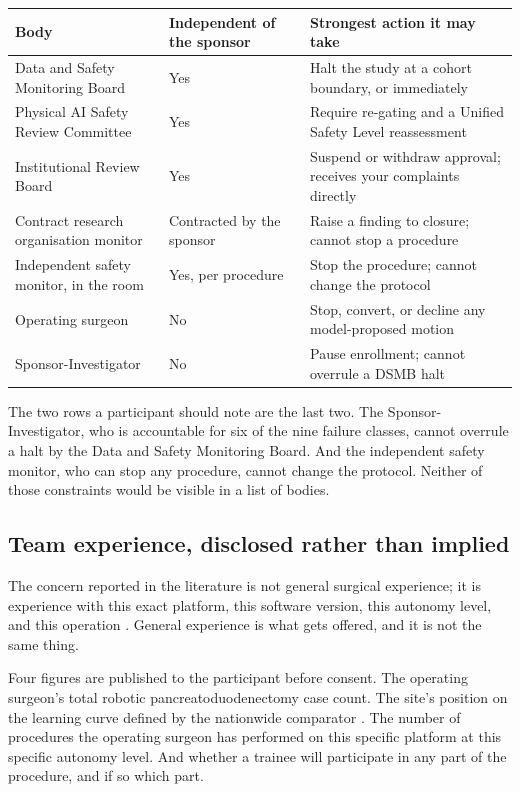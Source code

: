 \noindent\begin{tabularx}{\textwidth}{L{4.1cm} L{4.2cm} Y}
\toprule
\textbf{Body} & \textbf{Independent of the sponsor} & \textbf{Strongest action it may take} \\
\midrule
Data and Safety Monitoring Board & Yes & Halt the study at a cohort boundary, or immediately \\
Physical AI Safety Review Committee & Yes & Require re-gating and a Unified Safety Level reassessment \\
Institutional Review Board & Yes & Suspend or withdraw approval; receives your complaints directly \\
Contract research organisation monitor & Contracted by the sponsor & Raise a finding to closure; cannot stop a procedure \\
Independent safety monitor, in the room & Yes, per procedure & Stop the procedure; cannot change the protocol \\
Operating surgeon & No & Stop, convert, or decline any model-proposed motion \\
Sponsor-Investigator & No & Pause enrollment; cannot overrule a DSMB halt \\
\bottomrule
\end{tabularx}

\vspace{0.30em}

\noindent The two rows a participant should note are the last two. The
Sponsor-Investigator, who is accountable for six of the nine failure classes,
cannot overrule a halt by the Data and Safety Monitoring Board. And the
independent safety monitor, who can stop any procedure, cannot change the
protocol. Neither of those constraints would be visible in a list of bodies.

\subsection{Team experience, disclosed rather than implied}

The concern reported in the literature is not general surgical experience; it is
experience with this exact platform, this software version, this autonomy level,
and this operation \cite{WuSemiAI2026, Jauniaux2025}. General experience is what
gets offered, and it is not the same thing.

Four figures are published to the participant before consent. The operating
surgeon's total robotic pancreatoduodenectomy case count. The site's position on
the learning curve defined by the nationwide comparator \cite{DutchCohort2025}.
The number of procedures the operating surgeon has performed on this specific
platform at this specific autonomy level. And whether a trainee will participate
in any part of the procedure, and if so which part.

